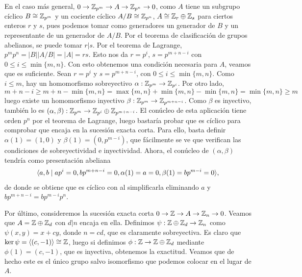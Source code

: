 \documentclass[twoside]{article}
\begin{document}
\begin{solucion}
En el caso más general, $0\to \mathbb{Z}_{p^m}\to A\to \mathbb{Z}_{p^n}\to 0$, como $A$ tiene un subgrupo cíclico $B\cong\mathbb{Z}_{p^m}$ y un cociente cíclico $A/B\cong\mathbb{Z}_{p^n}$, $A\cong\mathbb{Z}_r\oplus\mathbb{Z}_s$ para ciertos enteros $r$ y $s$, pues podemos tomar como generadores un generador de $B$ y un representante de un generador de $A/B$. Por el teorema de clasificación de grupos abelianos, se puede tomar $r|s$. Por el teorema de Lagrange, $p^mp^n=|B||A/B|=|A|= rs$. Esto nos da $r=p^i$, $s=p^{m+n-i}$ con $0\leq i\leq \min\{m,n\}$. Con esto obtenemos una condición necesaria para $A$, veamos que es suficiente. Sean $r=p^i$ y $s=p^{m+n-i}$, con $0\leq i\leq\min\{m,n\}$. Como $i\leq m$, hay un homomorfismo sobreyectivo $\alpha:\mathbb{Z}_{p^m}\to \mathbb{Z}_{p^i}$. Por otro lado, 
\[
m+n-i\geq m+n-\min\{m,n\}=\max\{m,n\}+\min\{m,n\}-\min\{m,n\}=\min\{m,n\}\geq m
\] 
luego existe un homomorfismo inyectivo $\beta:\mathbb{Z}_{p^m}\to\mathbb{Z}_{p^{m+n-i}}$. Como $\beta$ es inyectivo, también lo es $(\alpha,\beta):\mathbb{Z}_{p^m}\to \mathbb{Z}_{p^i}\oplus\mathbb{Z}_{p^{m+n-i}}$. El conúcleo de esta aplicación tiene orden $p^n$ por el teorema de Lagrange, luego bastaría probar que es cíclico para comprobar que encaja en la sucesión exacta corta. Para ello, basta definir $\alpha(1)=(1,0)$ y $\beta(1)=(0, p^{m-i})$, que fácilmente se ve que verifican las condiciones de sobreyectividad e inyectividad. Ahora, el conúcleo de $(\alpha,\beta)$ tendría como presentación abeliana $$\langle{a,b\mid ap^i=0, bp^{m+n-i}=0, \alpha(1)=a=0, \beta(1)=bp^{m-i}=0}\rangle,$$ de donde se obtiene que es cíclico con al simplificarla eliminando $a$ y $bp^{m+n-i}=bp^{m-i}p^n$.


  

Por último, consideremos la sucesión exacta corta $0\to\mathbb{Z}\to A\to \mathbb{Z}_n\to 0$. Veamos que $A=\mathbb{Z}\oplus\mathbb{Z}_d$ con $d|n$ encaja en ella. Definimos $\psi:\mathbb{Z}\oplus\mathbb{Z}_d\to\mathbb{Z}_n$ como $\psi(x,y)=x+cy$, donde $n=cd$, que es claramente sobreyectiva. Es claro que $\ker\psi=\langle{(c,-1)}\rangle\cong\mathbb{Z}$, luego si definimos $\phi:\mathbb{Z}\to \mathbb{Z}\oplus\mathbb{Z}_d$ mediante $\phi(1)=(c,-1)$, que es inyectiva, obtenemos la exactitud. Veamos que de hecho este es el único grupo salvo isomorfismo que podemos colocar en el lugar de $A$.
    

\end{solucion}
\end{document}
